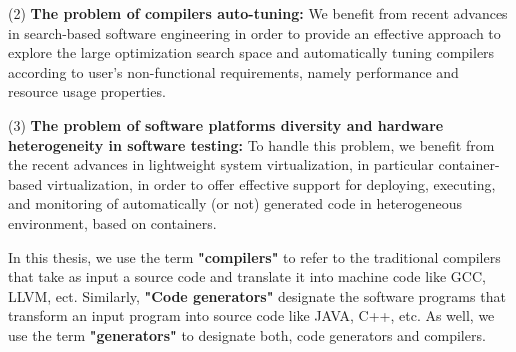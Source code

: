 	(2) \textbf{The problem of compilers auto-tuning:}  We benefit from recent advances in search-based software engineering in order to provide an effective approach to explore the large optimization search space and automatically tuning compilers according to user's non-functional requirements, namely performance and resource usage properties.

	(3) \textbf{The problem of software platforms diversity and hardware heterogeneity in software testing:} To handle this problem, we benefit from the recent advances in lightweight system virtualization, in particular container-based virtualization, in order to offer effective support for deploying, executing, and monitoring of automatically (or not) generated code in heterogeneous environment, based on containers.

In this thesis, we use the term \textbf{"compilers"} to refer to the traditional compilers that take as input a source code and translate it into machine code like GCC, LLVM, ect. Similarly, \textbf{"Code generators"} designate the software programs that transform an input program into source code like JAVA, C++, etc. As well, we use the term \textbf{"generators"} to designate both, code generators and compilers. 

